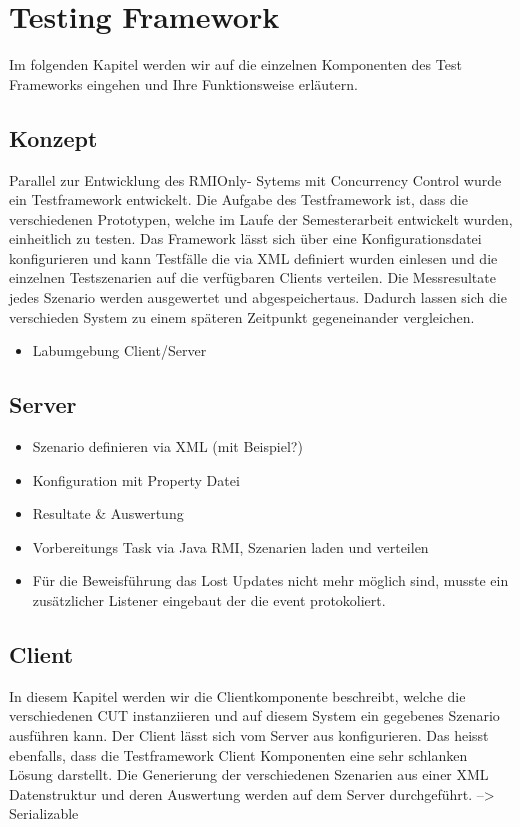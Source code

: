 \section{Testing Framework}
\label{sec:testing Framework}
Im folgenden Kapitel werden wir auf die einzelnen Komponenten des Test Frameworks eingehen und Ihre Funktionsweise erläutern.


\subsection{Konzept}
Parallel zur Entwicklung des RMIOnly- Sytems mit Concurrency Control wurde ein Testframework entwickelt. Die Aufgabe des Testframework ist, dass die verschiedenen Prototypen, welche im Laufe der Semesterarbeit entwickelt wurden, einheitlich zu testen. Das Framework lässt sich über eine Konfigurationsdatei konfigurieren und kann Testfälle die via XML definiert wurden einlesen und die einzelnen Testszenarien auf die verfügbaren Clients verteilen. Die Messresultate jedes Szenario werden ausgewertet und abgespeichertaus. Dadurch lassen sich die verschieden System zu einem späteren Zeitpunkt gegeneinander vergleichen.

\begin{itemize}
\item Labumgebung \/ Client/Server
\end{itemize}


\subsection{Server}
\label{sec:test-FW Server}
\begin{itemize}
\item Szenario definieren via XML (mit Beispiel?)
\item Konfiguration mit Property Datei
\item Resultate \& Auswertung
\item Vorbereitungs Task via Java RMI, Szenarien laden und verteilen
\item Für die Beweisführung das Lost Updates nicht mehr möglich sind, musste ein zusätzlicher Listener eingebaut der die event protokoliert.
\end{itemize}

\subsection{Client}
\label{sec:test-FW Client}
In diesem Kapitel werden wir die Clientkomponente beschreibt, welche die verschiedenen CUT instanziieren und auf diesem System ein gegebenes Szenario ausführen kann. Der Client lässt sich vom Server aus konfigurieren. Das heisst ebenfalls, dass die Testframework Client Komponenten eine sehr schlanken Lösung darstellt. Die Generierung der verschiedenen Szenarien aus einer XML Datenstruktur und deren Auswertung werden auf dem Server durchgeführt. --> Serializable


